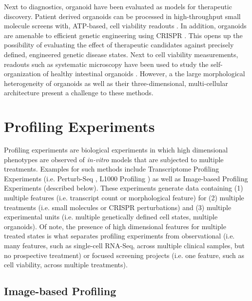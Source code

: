 \begin{flushleft}
Next to diagnostics, organoid have been evaluated as models for therapeutic discovery. Patient derived organoids can be processed in high-throughput small molecule screens with, ATP-based, cell viability readouts \parencite{vandeweteringProspectiveDerivationLiving2015, boehnkeAssayEstablishmentValidation2016a}. In addition, organoids are amenable to efficient genetic engineering using CRISPR \parencite{matanoModelingColorectalCancer2015a, drostSequentialCancerMutations2015}. This opens up the possibility of evaluating the effect of therapeutic candidates against precisely defined, engineered genetic disease states. Next to cell viability measurements, readouts such as systematic microscopy have been used to study the self-organization of healthy intestinal organoids \parencite{lukoninPhenotypicLandscapeIntestinal2020}. However, a the large morphological heterogeneity of organoids as well as their three-dimensional, multi-cellular architecture present a challenge to these methods.

\section{Profiling Experiments} 

Profiling experiments are biological experiments in which high dimensional phenotypes are observed of \textit{in-vitro} models that are subjected to multiple treatments. Examples for such methods include Transcriptome Profiling Experiments (i.e. Perturb-Seq \parencite{dixitPerturbSeqDissectingMolecular2016}, L1000 Profiling \parencite{subramanianNextGenerationConnectivity2017}) as well as Image-based Profiling Experiments \parencite{caicedoApplicationsImagebasedProfiling2016} (described below). These experiments generate data containing (1) multiple features (i.e. transcript count or morphological feature) for (2) multiple treatments (i.e. small molecules or CRISPR perturbations) and (3) multiple experimental units (i.e. multiple genetically defined cell states, multiple organoids). Of note, the presence of high dimensional features for multiple treated states is what separates profiling experiments from observational (i.e. many features, such as single-cell RNA-Seq, across multiple clinical samples, but no prospective treatment) or focused screening projects (i.e. one feature, such as cell viability, across multiple treatments). 

\subsection{Image-based Profiling}


\end{flushleft}
